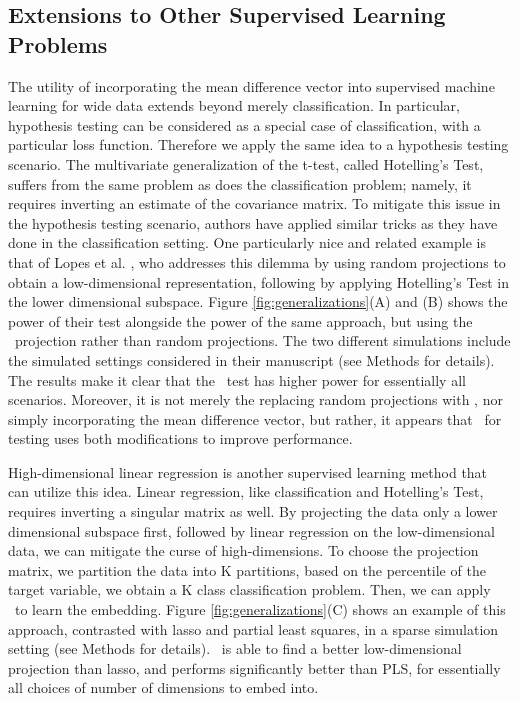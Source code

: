 \documentclass[10pt]{article}
\begin{document}
\subsection*{Extensions to Other Supervised Learning Problems}

The utility of incorporating the mean difference vector into supervised machine learning for wide data extends beyond merely classification.  In particular, hypothesis testing can be considered as a special case of classification, with a particular loss function.  Therefore we apply the same idea to a hypothesis testing scenario.  The multivariate generalization of the t-test, called Hotelling's Test, suffers from the same problem as does the classification problem; namely, it requires inverting an estimate of the covariance matrix. To mitigate this issue in the hypothesis testing scenario, authors have applied similar tricks as they have done in the classification setting. One particularly nice and related example is that of  Lopes et al. \cite{Lopes2011}, who addresses this dilemma by using random projections to obtain a low-dimensional representation, following by applying Hotelling's Test in the lower dimensional subspace.  Figure \ref{fig:generalizations}(A) and (B) shows the power of their test alongside the power of the same approach, but using the \Lol~projection rather than random projections.  The two different simulations include the simulated settings considered in their manuscript (see Methods for details).  The results make it clear that the \Lol~test has higher power for essentially all scenarios.  Moreover, it is not merely the replacing random projections with \Pca, nor simply incorporating the mean difference vector, but rather, it appears that \Lol~for testing uses both modifications to improve performance.

High-dimensional linear regression is another supervised learning method that can utilize this idea. Linear regression, like classification and Hotelling's Test, requires inverting a singular matrix as well.  By projecting the data only a lower dimensional subspace first, followed by linear regression on the low-dimensional data, we can mitigate the curse of high-dimensions.  To choose the projection matrix, we partition the data into K partitions, based on the percentile of the target variable, we obtain a K class classification problem.  Then, we can apply \Lol~to learn the embedding.  Figure \ref{fig:generalizations}(C) shows an example of this approach, contrasted with lasso and partial least squares, in a sparse simulation setting (see Methods for details). \Lol~is able to find a better low-dimensional projection than lasso, and performs significantly better than PLS, for essentially all choices of number of dimensions to embed into.
\end{document}
